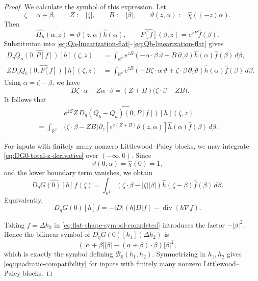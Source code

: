 \documentclass[12pt]{amsart}
\theoremstyle{remark}
\theoremstyle{definition}
\numberwithin{equation}{section}
\newcommand{\R}{\mathbb{R}}
\begin{document}
\begin{proof}
We calculate the symbol of this expression. Let
\[
 \zeta=\alpha+\beta, \qquad Z:=|\zeta|, \qquad B:=|\beta|, \qquad \vartheta(z,\alpha) := \widehat\chi((-z)\alpha).
\]
Then
\[
 \widehat{H_h}(\alpha,z) = \vartheta(z,\alpha)\widehat h(\alpha), \qquad
 \widehat{P[f]}(\beta,z) = e^{zB}\widehat f(\beta).
\]
Substitution into
\eqref{eq:Qa-linearization-flat}--\eqref{eq:Qb-linearization-flat}
gives
\begin{align*}
 \widehat{D_\eta Q_a(0,P[f])[h]}(\zeta,z)
 &= \int_{\R^2} e^{zB} \left(
  -\alpha\cdot\beta\,\vartheta  +  B\,\partial_z\vartheta \right)
 \widehat h(\alpha)\widehat f(\beta)\,d\beta,\\
 Z\widehat{D_\eta Q_b(0,P[f])[h]}(\zeta,z)
 &= \int_{\R^2} e^{zB} \left( -B\zeta\cdot\alpha\,\vartheta + \zeta\cdot\beta\,\partial_z\vartheta \right)
 \widehat h(\alpha)\widehat f(\beta)\,d\beta.
\end{align*}
Using \(\alpha=\zeta-\beta\), we have
\[
 -B\zeta\cdot\alpha + Z\alpha\cdot\beta = (Z+B) \bigl(  \zeta\cdot\beta-ZB \bigr).
\]
It follows that
\begin{equation} \label{eq:DG0-total-z-derivative}
\begin{aligned}
&e^{zZ}Z\,
\widehat{D_\eta(Q_b-Q_a)(0,P[f])[h]}(\zeta,z)
 \\
 = \int_{\R^2}& \bigl(  \zeta\cdot\beta-ZB \bigr) \partial_z \left[ e^{z(Z+B)} \vartheta(z,\alpha) \right]
 \widehat h(\alpha)\widehat f(\beta)\,d\beta.
\end{aligned}
\end{equation}

For inputs with finitely many nonzero Littlewood--Paley blocks,
we may integrate \eqref{eq:DG0-total-z-derivative} over
\((-\infty,0)\). Since
\[
\vartheta(0,\alpha)=\widehat\chi(0)=1,
\]
and the lower boundary term vanishes, we obtain
\begin{equation}
\label{eq:flat-shape-symbol-completed}
 \widehat{D_\eta G(0)[h]f}(\zeta)
 = \int_{\R^2}
 \left(  \zeta\cdot\beta-|\zeta||\beta|
 \right) \widehat h(\zeta-\beta)
 \widehat f(\beta)\,d\beta.
\end{equation}
Equivalently,
\[
 D_\eta G(0)[h]f
 = -|D|(h|D|f) - \operatorname{div}(h\nabla f).
\]

Taking \(f=\Delta h_2\) in
\eqref{eq:flat-shape-symbol-completed} introduces the factor
\(-|\beta|^2\). Hence the bilinear symbol of
\(D_\eta G(0)[h_1](\Delta h_2)\) is
\[
 \left( |\alpha+\beta||\beta| -
  (\alpha+\beta)\cdot\beta \right)|\beta|^2,
\]
which is exactly the symbol defining \(\mathcal B_0(h_1,h_2)\). Symmetrizing in \(h_1,h_2\) gives
\eqref{eq:quadratic-compatibility} for inputs with finitely many
nonzero Littlewood--Paley blocks.


\end{proof}
\end{document}
